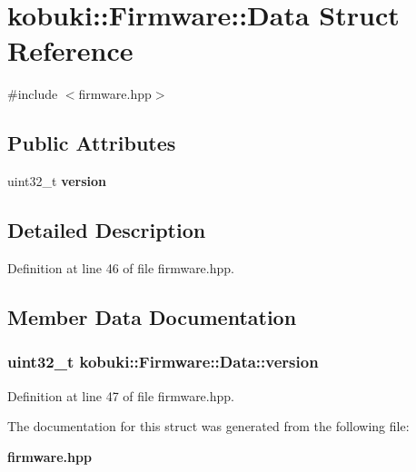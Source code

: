 \section{kobuki\-:\-:\-Firmware\-:\-:\-Data \-Struct \-Reference}
\label{structkobuki_1_1Firmware_1_1Data}


{\ttfamily \#include $<$firmware.\-hpp$>$}

\subsection*{\-Public \-Attributes}
\begin{DoxyCompactItemize}
\item 
uint32\-\_\-t {\bf version}
\end{DoxyCompactItemize}


\subsection{\-Detailed \-Description}


\-Definition at line 46 of file firmware.\-hpp.



\subsection{\-Member \-Data \-Documentation}
\subsubsection[{version}]{\setlength{\rightskip}{0pt plus 5cm}uint32\-\_\-t {\bf kobuki\-::\-Firmware\-::\-Data\-::version}}\label{structkobuki_1_1Firmware_1_1Data_aa1755f72354675dcd3dcda77eb6d055c}


\-Definition at line 47 of file firmware.\-hpp.



\-The documentation for this struct was generated from the following file\-:\begin{DoxyCompactItemize}
\item 
{\bf firmware.\-hpp}\end{DoxyCompactItemize}
